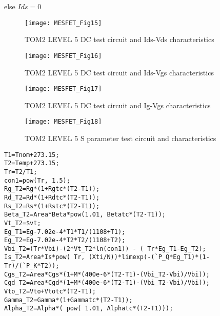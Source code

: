 else $Ids =0$




\begin{figure}  
  \centering
  \texttt{[image: MESFET\_Fig15]} 
  \caption{TOM2 LEVEL 5 DC test circuit and Ids-Vds characteristics}   
  \label{fig:fig15}
\end{figure}

\begin{figure} 
  \centering
  \texttt{[image: MESFET\_Fig16]}  
  \caption{TOM2 LEVEL 5 DC test circuit and Ids-Vgs characteristics} 
  \label{fig:fig16}
\end{figure} 

\begin{figure} 
  \centering
  \texttt{[image: MESFET\_Fig17]} 
  \caption{TOM2 LEVEL 5 DC test circuit and Ig-Vgs characteristics} 
  \label{fig:fig17}
\end{figure} 

\begin{figure} 
  \centering
  \texttt{[image: MESFET\_Fig18]}  
  \caption{TOM2 LEVEL 5 S parameter test circuit and characteristics} 
  \label{fig:fig18} 
\end{figure} 

\begin{verbatim}
T1=Tnom+273.15;
T2=Temp+273.15;
Tr=T2/T1;
con1=pow(Tr, 1.5);
Rg_T2=Rg*(1+Rgtc*(T2-T1));
Rd_T2=Rd*(1+Rdtc*(T2-T1));
Rs_T2=Rs*(1+Rstc*(T2-T1));
Beta_T2=Area*Beta*pow(1.01, Betatc*(T2-T1));
Vt_T2=$vt;
Eg_T1=Eg-7.02e-4*T1*T1/(1108+T1);
Eg_T2=Eg-7.02e-4*T2*T2/(1108+T2);
Vbi_T2=(Tr*Vbi)-(2*Vt_T2*ln(con1)) - ( Tr*Eg_T1-Eg_T2);
Is_T2=Area*Is*pow( Tr, (Xti/N))*limexp(-(`P_Q*Eg_T1)*(1-Tr)/(`P_K*T2));
Cgs_T2=Area*Cgs*(1+M*(400e-6*(T2-T1)-(Vbi_T2-Vbi)/Vbi));
Cgd_T2=Area*Cgd*(1+M*(400e-6*(T2-T1)-(Vbi_T2-Vbi)/Vbi)); 
Vto_T2=Vto+Vtotc*(T2-T1);
Gamma_T2=Gamma*(1+Gammatc*(T2-T1));
Alpha_T2=Alpha*( pow( 1.01, Alphatc*(T2-T1)));
\end{verbatim} 




